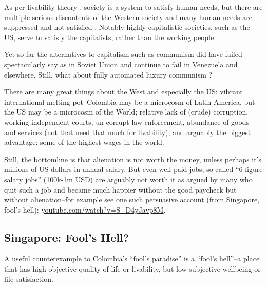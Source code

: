 \documentclass[10pt, letterpaper]{article}
\begin{document}
\begin{spacing}{2}

 

 As per livability theory \citep{veenhoven14b}, society is a system to satisfy
 human needs, but there are multiple serious discontents of the Western society
 and many human needs are suppressed and not satisfied \citep{freud30}. Notably highly
 capitalistic societies, such as the US,  serve to satisfy the capitalists, rather
 than the working people \citep{marx10}.%

 {
Yet so far the alternatives to capitalism such as communism did have failed spectacularly say
as in Soviet Union %
and continue to fail in Venezuela and
elsewhere. Still, what about fully automated luxury communism \citep{bastani19}?
%  

There are many great things about the West and
especially the US: vibrant international
melting pot--Colombia may be a microcosm of Latin America, but the US may be a
microcosm of the World; %
 relative lack of (crude) corruption, working independent courts,
un-corrupt law enforcement, abundance of goods and services (not that need that
much for livability), and arguably the biggest advantage: some of the highest wages in
the world.

Still, the bottomline is that alienation is not worth the money, unless perhaps
it's millions of US dollars in annual salary. But even well paid jobs, so
called ``6 figure salary jobs'' (100k-1m USD) are arguably not worth it as
 argued by many  who quit such a job and  became much happier
without the good paycheck but without alienation--for example see one such
persuasive account (from Singapore, fool's hell): \url{youtube.com/watch?v=S_D4yJavp8M}.
}

 

%

   
\subsection{Singapore:  Fool's Hell?}

A useful counterexample to Colombia's ``fool's paradise'' is a ``fool's hell''--a place that has
high objective quality of life or livability, but low subjective wellbeing or
life satisfaction. 


\end{spacing}
\end{document}
